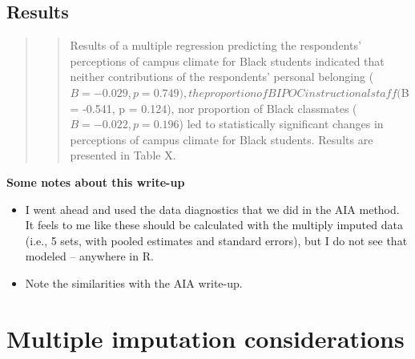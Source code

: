 \documentclass[
  11pt,
]{book}
\providecommand{\tightlist}{%
  \setlength{\itemsep}{0pt}\setlength{\parskip}{0pt}}
\begin{document}
\hypertarget{results-2}{%
\subsection{Results}\label{results-2}}

\begin{quote}
\begin{quote}
Results of a multiple regression predicting the respondents' perceptions of campus climate for Black students indicated that neither contributions of the respondents' personal belonging (\(B = -0.029, p = 0.749), the proportion of BIPOC instructional staff (\)B = -0.541, p = 0.124), nor proportion of Black classmates (\(B = -0.022, p = 0.196\)) led to statistically significant changes in perceptions of campus climate for Black students. Results are presented in Table X.
\end{quote}
\end{quote}

\textbf{Some notes about this write-up}

\begin{itemize}
\tightlist
\item
  I went ahead and used the data diagnostics that we did in the AIA method. It feels to me like these should be calculated with the multiply imputed data (i.e., 5 sets, with pooled estimates and standard errors), but I do not see that modeled -- anywhere in R.
\item
  Note the similarities with the AIA write-up.
\end{itemize}

\hypertarget{multiple-imputation-considerations}{%
\section{Multiple imputation considerations}\label{multiple-imputation-considerations}}
\end{document}
